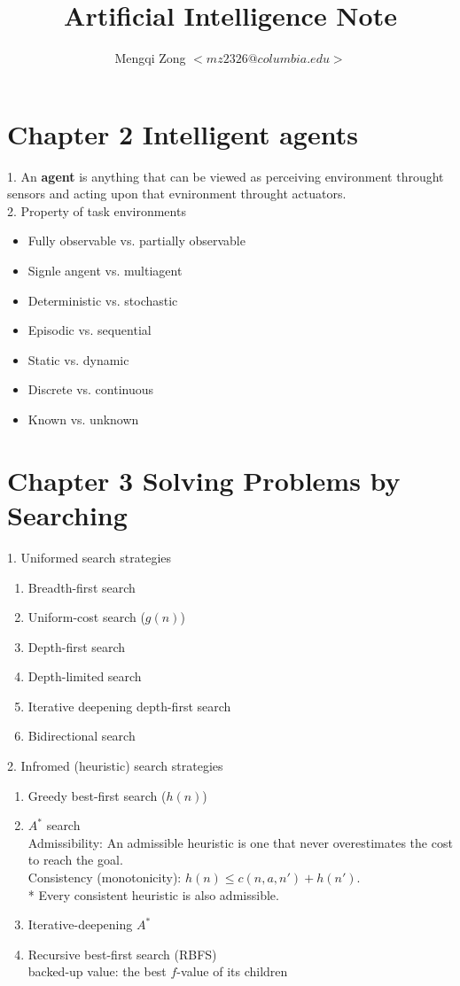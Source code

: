 \documentclass[12pt]{article}
\title{Artificial Intelligence Note}
\author{Mengqi Zong $<mz2326@columbia.edu>$}
\begin{document}
\maketitle

\setlength{\parindent}{0in}

\section{Chapter 2 Intelligent agents}

1. An {\bf agent} is anything that can be viewed as perceiving environment throught sensors and acting upon that evnironment throught actuators. \\

2. Property of task environments

\begin{itemize}
  \item Fully observable vs. partially observable
  \item Signle angent vs. multiagent
  \item Deterministic vs. stochastic
  \item Episodic vs. sequential
  \item Static vs. dynamic
  \item Discrete vs. continuous
  \item Known vs. unknown
\end{itemize}

\section{Chapter 3 Solving Problems by Searching}

1. Uniformed search strategies

\begin{enumerate}
  \item Breadth-first search
  \item Uniform-cost search ($g(n)$)
  \item Depth-first search
  \item Depth-limited search
  \item Iterative deepening depth-first search
  \item Bidirectional search
\end{enumerate}

2. Infromed (heuristic) search strategies

\begin{enumerate}
  \item Greedy best-first search ($h(n)$)
  \item $A^*$ search \\
    Admissibility: An admissible heuristic is one that never overestimates the cost to reach the goal. \\
    Consistency (monotonicity): $h(n) \le c(n,a,n') + h(n')$. \\
    * Every consistent heuristic is also admissible.
  \item Iterative-deepening $A^*$
  \item Recursive best-first search (RBFS) \\
    backed-up value: the best $f$-value of its children
\end{enumerate}
\end{document}
